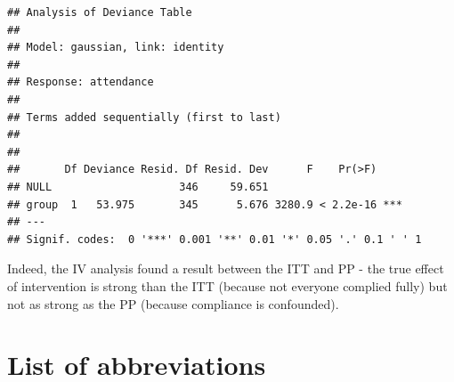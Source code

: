 \documentclass[
]{book}
\begin{document}
\begin{verbatim}
## Analysis of Deviance Table
## 
## Model: gaussian, link: identity
## 
## Response: attendance
## 
## Terms added sequentially (first to last)
## 
## 
##       Df Deviance Resid. Df Resid. Dev      F    Pr(>F)    
## NULL                    346     59.651                     
## group  1   53.975       345      5.676 3280.9 < 2.2e-16 ***
## ---
## Signif. codes:  0 '***' 0.001 '**' 0.01 '*' 0.05 '.' 0.1 ' ' 1
\end{verbatim}

Indeed, the IV analysis found a result between the ITT and PP - the true effect of intervention is strong than the ITT (because not everyone complied fully) but not as strong as the PP (because compliance is confounded).

\chapter*{List of abbreviations}\label{list-of-abbreviations}
\end{document}

